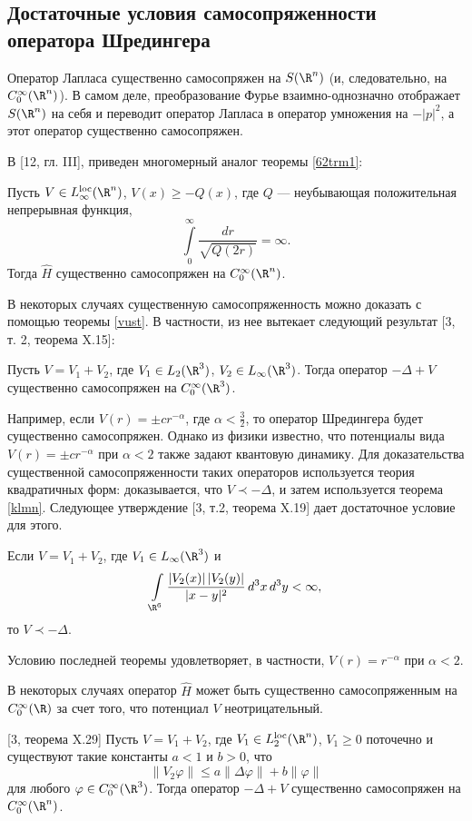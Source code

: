 \documentclass[a4paper
]{article}
\begin{document}
\subsection{Достаточные условия самосопряженности оператора Шредингера}
Оператор Лапласа существенно самосопряжен на $S(\R^n)$
(и, следовательно, на $C_0^\infty(\R^n)$). В самом деле, преобразование
Фурье взаимно-однозначно отображает $S(\R^n)$ на себя и переводит оператор
Лапласа в оператор умножения на $-|p|^2$, а этот оператор существенно
самосопряжен. \par
В [12, гл. III], приведен многомерный аналог теоремы \ref{62trm1}:
\begin{Trm}
Пусть $V\in L_\infty^{{\rm loc}}(\R^n)$, $V(x)\ge -Q(x)$, где $Q$ ---
неубывающая положительная непрерывная функция, $$\int \limits_0^\infty
\frac{dr}{\sqrt{Q(2r)}}=\infty.$$ Тогда $\hat H$ существенно
самосопряжен на $C_0^\infty(\R^n)$.
\end{Trm}
В некоторых случаях существенную самосопряженность можно доказать с
помощью теоремы \ref{vust}. В частности, из нее вытекает следующий
результат [3, т. 2, теорема X.15]:
\begin{Trm}
Пусть $V=V_1+V_2$, где $V_1\in L_2(\R^3)$, $V_2\in L_\infty(\R^3)$. Тогда
оператор $-\Delta+V$ существенно самосопряжен на $C_0^\infty(\R^3)$.
\end{Trm}
Например, если $V(r)=\pm cr^{-\alpha}$, где $\alpha<\frac32$, то оператор
Шредингера будет существенно самосопряжен. Однако из физики известно,
что потенциалы вида $V(r)=\pm cr^{-\alpha}$  при $\alpha<2$ также
задают квантовую динамику. Для доказательства существенной
самосопряженности таких операторов используется теория квадратичных
форм: доказывается, что $V\prec -\Delta$, и затем используется теорема
\ref{klmn}. Следующее утверждение [3, т.2, теорема X.19] дает
достаточное условие для этого.
\begin{Trm}
Если $V=V_1+V_2$, где $V_1\in L_\infty(\R^3)$ и $$\int \limits _{\R^6}
\frac{|V_2(x)|\, |V_2(y)|}{|x-y|^2}\, d^3x\, d^3y<\infty,$$
то $V\prec -\Delta$.
\end{Trm}
Условию последней теоремы удовлетворяет, в частности, $V(r)=r^{-\alpha}$
при $\alpha<2$. \par
В некоторых случаях оператор $\hat H$ может быть существенно самосопряженным
на $C_0^\infty(\R)$ за счет того, что потенциал $V$ неотрицательный.
\begin{Trm} {\rm [3, теорема X.29]}
Пусть $V=V_1+V_2$, где $V_1\in L_2^{{\rm loc}}(\R^n)$, $V_1\ge 0$ поточечно
и существуют такие константы $a<1$ и $b>0$, что $$\|V_2\varphi\|
\le a\|\Delta \varphi\|+b\|\varphi\|$$ для любого $\varphi\in C_0^\infty
(\R^3)$. Тогда оператор $-\Delta+V$ существенно самосопряжен на
$C_0^\infty(\R^n)$.
\end{Trm}
\end{document}
